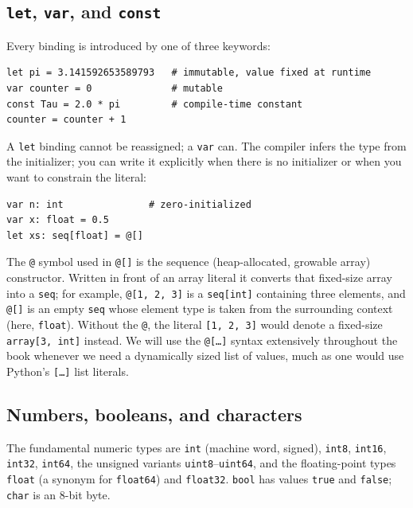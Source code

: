 \documentclass[justified, sixbynine]{tufte-book}
\def\ft{\small\tt}
\theoremstyle{plain}%
\newtheorem * {corollary}{Corollary}
\theoremstyle{definition}
\theoremstyle{remark}
\newtheorem * {remark}{Remark}
\newtheorem * {note}{Note}
\begin{document}
\begin{fullwidth}
\goodbreak\subsection{{\ft let}, {\ft var}, and {\ft const}}

Every binding is introduced by one of three keywords:

\begin{lstlisting}
let pi = 3.141592653589793   # immutable, value fixed at runtime
var counter = 0              # mutable
const Tau = 2.0 * pi         # compile-time constant
counter = counter + 1
\end{lstlisting}

A {\ft let} binding cannot be reassigned; a {\ft var} can. The compiler infers the type from the initializer; you can write it explicitly when there is no initializer or when you want to constrain the literal:

\begin{lstlisting}
var n: int               # zero-initialized
var x: float = 0.5
let xs: seq[float] = @[]
\end{lstlisting}

The {\ft @} symbol used in {\ft @[]} is the sequence (heap-allocated, growable array) constructor. Written in front of an array literal it converts that fixed-size array into a {\ft seq}; for example, {\ft @[1, 2, 3]} is a {\ft seq[int]} containing three elements, and {\ft @[]} is an empty {\ft seq} whose element type is taken from the surrounding context (here, {\ft float}). Without the {\ft @}, the literal {\ft [1, 2, 3]} would denote a fixed-size {\ft array[3, int]} instead. We will use the {\ft @[\dots]} syntax extensively throughout the book whenever we need a dynamically sized list of values, much as one would use Python's {\ft [\dots]} list literals.

\goodbreak\subsection{Numbers, booleans, and characters}


The fundamental numeric types are {\ft int} (machine word, signed), {\ft int8}, {\ft int16}, {\ft int32}, {\ft int64}, the unsigned variants {\ft uint8}--{\ft uint64}, and the floating-point types {\ft float} (a synonym for {\ft float64}) and {\ft float32}. {\ft bool} has values {\ft true} and {\ft false}; {\ft char} is an 8-bit byte.


\end{fullwidth}
\end{document}
